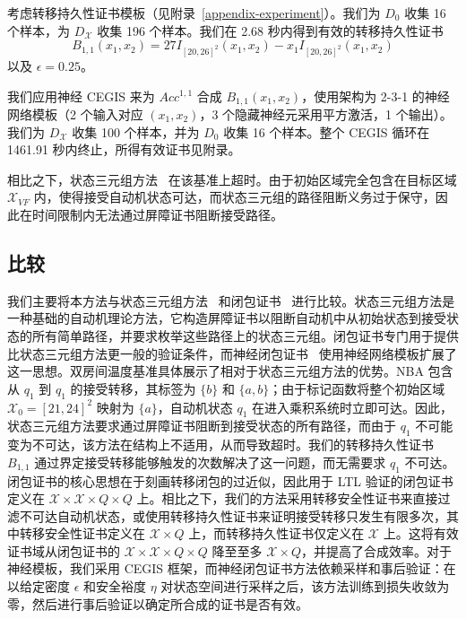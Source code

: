 考虑转移持久性证书模板（见附录~\ref{appendix-experiment}）。我们为 $D_0$ 收集 16 个样本，为 $D_{\mathcal{X}}$ 收集 196 个样本。我们在 2.68 秒内得到有效的转移持久性证书 $$B_{1,1}(x_1, x_2) = 27 I_{[20,26]^2}(x_1, x_2) - x_1 I_{[20,26]^2}(x_1, x_2)$$ 以及 $\epsilon = 0.25$。

我们应用神经 CEGIS 来为 $Acc^{1,1}$ 合成 $B_{1,1}(x_1, x_2)$，使用架构为 2-3-1 的神经网络模板（2 个输入对应 $(x_1, x_2)$，3 个隐藏神经元采用平方激活，1 个输出）。我们为 $D_{\mathcal{X}}$ 收集 100 个样本，并为 $D_0$ 收集 16 个样本。整个 CEGIS 循环在 1461.91 秒内终止，所得有效证书见附录。

相比之下，状态三元组方法~\cite{wongpiromsarn2015automata} 在该基准上超时。由于初始区域完全包含在目标区域 $\mathcal{X}_{VF}$ 内，使得接受自动机状态可达，而状态三元组的路径阻断义务过于保守，因此在时间限制内无法通过屏障证书阻断接受路径。

\subsection{比较}
我们主要将本方法与状态三元组方法~\cite{wongpiromsarn2015automata} 和闭包证书~\cite{murali2024closure} 进行比较。状态三元组方法是一种基础的自动机理论方法，它构造屏障证书以阻断自动机中从初始状态到接受状态的所有简单路径，并要求枚举这些路径上的状态三元组。闭包证书专门用于提供比状态三元组方法更一般的验证条件，而神经闭包证书~\cite{nadali2024neural} 使用神经网络模板扩展了这一思想。双房间温度基准具体展示了相对于状态三元组方法的优势。NBA 包含从 $q_1$ 到 $q_1$ 的接受转移，其标签为 $\{b\}$ 和 $\{a,b\}$；由于标记函数将整个初始区域 $\mathcal{X}_0=[21,24]^2$ 映射为 $\{a\}$，自动机状态 $q_1$ 在进入乘积系统时立即可达。因此，状态三元组方法要求通过屏障证书阻断到接受状态的所有路径，而由于 $q_1$ 不可能变为不可达，该方法在结构上不适用，从而导致超时。我们的转移持久性证书 $B_{1,1}$ 通过界定接受转移能够触发的次数解决了这一问题，而无需要求 $q_1$ 不可达。闭包证书的核心思想在于刻画转移闭包的过近似，因此用于 LTL 验证的闭包证书定义在 $\mathcal{X} \times \mathcal{X} \times Q \times Q$ 上。相比之下，我们的方法采用转移安全性证书来直接过滤不可达自动机状态，或使用转移持久性证书来证明接受转移只发生有限多次，其中转移安全性证书定义在 $\mathcal{X} \times Q$ 上，而转移持久性证书仅定义在 $\mathcal{X}$ 上。这将有效证书域从闭包证书的 $\mathcal{X} \times \mathcal{X} \times Q \times Q$ 降至至多 $\mathcal{X} \times Q$，并提高了合成效率。对于神经模板，我们采用 CEGIS 框架，而神经闭包证书方法依赖采样和事后验证：在以给定密度 $\epsilon$ 和安全裕度 $\eta$ 对状态空间进行采样之后，该方法训练到损失收敛为零，然后进行事后验证以确定所合成的证书是否有效。

